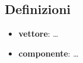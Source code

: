 \subsection*{Definizioni}
\begin{itemize}
\item {\bfseries vettore}:
\ldots
\item {\bfseries componente}:
\ldots
\end{itemize}


